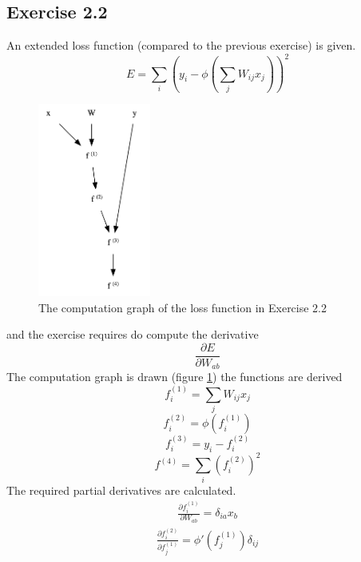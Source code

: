 \documentclass[fleqn]{report}
\begin{document}
\subsection*{Exercise 2.2}
An extended loss function (compared to the previous exercise) is given.
\begin{equation}
    E = \sum_i \left( y_i - \phi \left ( \sum_j W_{ij} x_j \right ) \right)^2
\end{equation}
\begin{figure}
    \centering
    \includegraphics[height=2.5in]{cg22.png}
    \caption{The computation graph of the loss function in Exercise 2.2}
    \label{fig:cg22}
\end{figure}
and the exercise requires do compute the derivative
\begin{equation}
    \frac{\partial E}{\partial W_{ab}}
\end{equation}
The computation graph is drawn (figure \ref{fig:cg22}) the functions are derived
\begin{equation}
    f^{(1)}_i = \sum_j W_{ij} x_j
\end{equation}
\begin{equation}
    f^{(2)}_i = \phi (f^{(1)}_i)
\end{equation}
\begin{equation}
    f^{(3)}_i = y_i - f^{(2)}_i
\end{equation}
\begin{equation}
    f^{(4)} = \sum_i \left( f^{(2)}_i \right )^2
\end{equation}
The required partial derivatives are calculated.
\begin{equation}
    \begin{split}
        \frac{\partial f^{(1)}_i}{\partial W_{ab}} = \delta_{ia} x_b
    \end{split}
\end{equation}
\begin{equation}
    \begin{split}
        \frac{\partial f^{(2)}_i}{\partial f^{(1)}_j} = \phi'(f^{(1)}_j) \delta_{ij}
    \end{split}
\end{equation}
\end{document}

